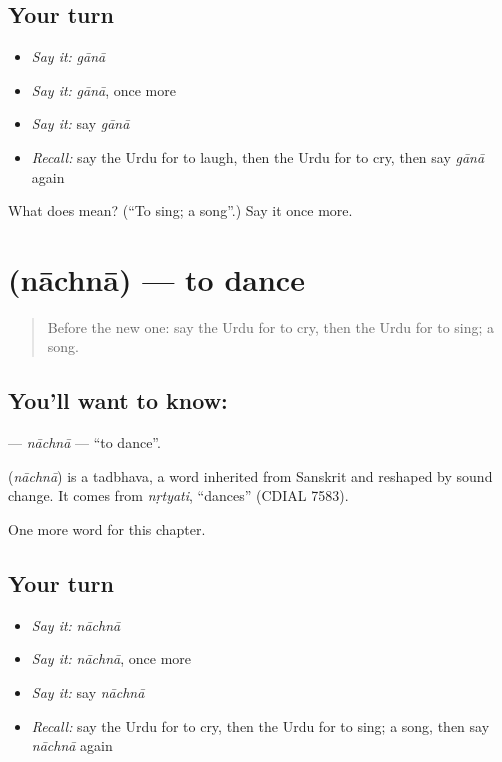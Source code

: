 \subsection*{Your turn}
\begin{itemize}
\raggedright
  \item \emph{Say it:} \emph{gānā}
  \item \emph{Say it:} \emph{gānā}, once more
  \item \emph{Say it:} say \emph{gānā}
  \item \emph{Recall:} say the Urdu for to laugh, then the Urdu for to cry, then say \emph{gānā} again
\end{itemize}

\begin{tcolorbox}[breakable,colback=teal!4,colframe=teal!35!black,title={Before you move on}]
What does  mean? (\textquotedblleft{}To sing; a song\textquotedblright{}.) Say it once more.
\end{tcolorbox}
\section[\texorpdfstring{\ur{ناچنا} (nāchnā)}{ناچنا (nāchnā)}]{ (nāchnā) — to dance}

\label{lesson:UR-C50-nachna}



\begin{quote}
Before the new one: say the Urdu for to cry, then the Urdu for to sing; a song.
\end{quote}

\subsection*{You'll want to know: }
\textbf{} — \emph{nāchnā} — \textquotedblleft{}to dance\textquotedblright{}.

\begin{cousinweb}
\textbf{} (\emph{nāchnā}) is a tadbhava, a word inherited from Sanskrit and reshaped by sound change. It comes from \emph{nṛtyati}, \textquotedblleft{}dances\textquotedblright{} (CDIAL 7583).
\end{cousinweb}

\begin{grammarlens}[title={What you've built}]
One more word for this chapter.
\end{grammarlens}

\subsection*{Your turn}
\begin{itemize}
\raggedright
  \item \emph{Say it:} \emph{nāchnā}
  \item \emph{Say it:} \emph{nāchnā}, once more
  \item \emph{Say it:} say \emph{nāchnā}
  \item \emph{Recall:} say the Urdu for to cry, then the Urdu for to sing; a song, then say \emph{nāchnā} again
\end{itemize}

